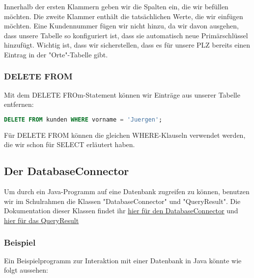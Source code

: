 \documentclass{article}
\begin{document}
	Innerhalb der ersten Klammern geben wir die Spalten ein, die wir befüllen möchten. Die zweite Klammer enthält die tatsächlichen Werte, die wir einfügen möchten. Eine Kundennummer fügen wir nicht hinzu, da wir davon ausgehen, dass unsere Tabelle so konfiguriert ist, dass sie automatisch neue Primärschlüssel hinzufügt. Wichtig ist, dass wir sicherstellen, dass es für unsere PLZ bereits einen Eintrag in der "Orte"-Tabelle gibt.

	\subsubsection{DELETE FROM}
	Mit dem DELETE FROm-Statement können wir Einträge aus unserer Tabelle entfernen:

	\begin{lstlisting}[language=SQL, caption=Wir entfernen alle Jürgens aus unserer Kundentabelle]
	DELETE FROM kunden WHERE vorname = 'Juergen';
	\end{lstlisting}

	Für DELETE FROM können die gleichen WHERE-Klauseln verwendet werden, die wir schon für SELECT erläutert haben.

	\subsection{Der DatabaseConnector}
Um durch ein Java-Programm auf eine Datenbank zugreifen zu können, benutzen wir im Schulrahmen die Klassen "DatabaseConnector" und "QueryResult". Die Dokumentation dieser Klassen findet ihr \href{https://www.schulentwicklung.nrw.de/lehrplaene/upload/klp\_SII/if/Dokumentation\_ZA-IF\_GK-LK\_ab\_2018\_2021\_12\_22.pdf#page=31}{\underline{hier für den DatabaseConnector}} und \href{https://www.schulentwicklung.nrw.de/lehrplaene/upload/klp\_SII/if/Dokumentation\_ZA-IF\_GK-LK\_ab\_2018\_2021\_12\_22.pdf#page=32}{\underline{hier für das QueryResult}}

	\subsubsection{Beispiel}
	Ein Beispielprogramm zur Interaktion mit einer Datenbank in Java könnte wie folgt aussehen:
\end{document}
